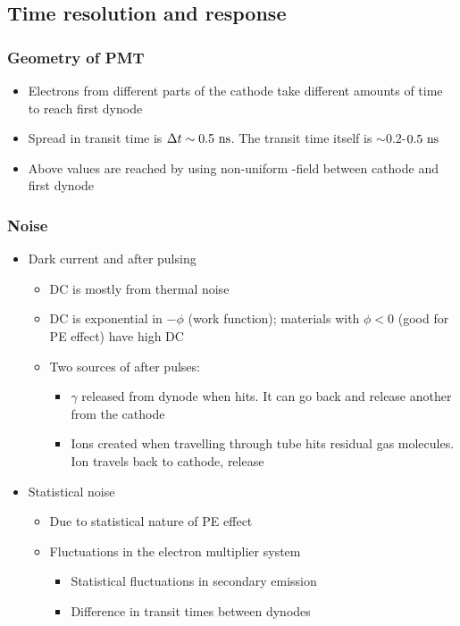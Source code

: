\subsection{Time resolution and response}
\subsubsection{Geometry of PMT}
\begin{itemize}
  \item Electrons from different parts of the cathode take different amounts of time to reach first dynode
  \item Spread in transit time is $\Delta t\sim 0.5~\text{ns}$. The transit time itself is $\sim 0.2$-$0.5~\text{ns}$
  \item Above values are reached by using non-uniform \E-field between cathode and first dynode
\end{itemize}
\subsubsection{Noise}
\begin{itemize}
  \item Dark current and after pulsing
  \begin{itemize}
    \item DC is mostly from thermal noise
    \item DC is exponential in $-\phi$ (work function); materials with $\phi<0$ (good for PE effect) have high DC
    \item Two sources of after pulses:
    \begin{itemize}
      \item $\gamma$ released from dynode when \el hits. It can go back and release another \el from the cathode
      \item Ions created when \el travelling through tube hits residual gas molecules. Ion travels back to cathode, release \el
    \end{itemize}
  \end{itemize}
  \item Statistical noise
  \begin{itemize}
    \item Due to statistical nature of PE effect
    \item Fluctuations in the electron multiplier system
    \begin{itemize}
      \item Statistical fluctuations in secondary emission
      \item Difference in \el transit times between dynodes
    \end{itemize}
  \end{itemize}
\end{itemize}

